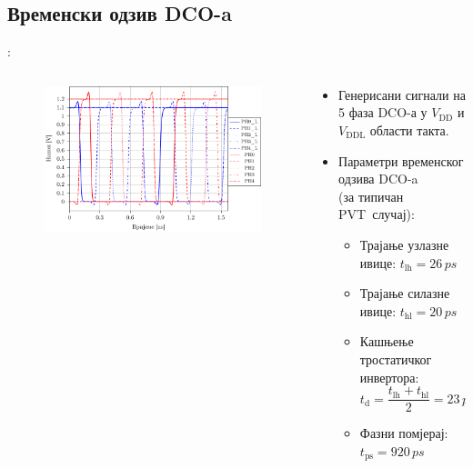 \documentclass[aspectratio=169]{beamer}
\def \DCO  {DCO} %
\def \PVT  {PVT} %
\begin{document}
\subsection{Временски одзив \DCO-a}

\begin{frame}{\secname: \subsecname}
    \begin{columns}[t]
        \begin{column}{0.54\textwidth}
            \begin{figure}[!t]
            	\centering
            	\includegraphics[scale=0.64]{slike/prezentacija/sim_DCO_phases.pdf}
            	\label{DCO_phases}
            \end{figure}
		\end{column}
		\begin{column}{0.46\textwidth}
	    \small
            \begin{itemize}
                \item Генерисани сигнали на 5 фаза \DCO-а у $V_\text{DD}$ и $V_\text{DDL}$ области такта.
                \item Параметри временског одзива \DCO-a \\ (за типичан \PVT\ случај):
                    \begin{itemize}
                        \item Трајање узлазне ивице: $t_\text{lh}=26\,ps$ 
                        \item Трајање силазне ивице: $t_\text{hl}=20\,ps$
                        \item Кашњење тростатичког инвертора:
                			\begin{equation}
                    			t_\text{d} = \dfrac{t_\text{lh} + t_\text{hl}}{2} = 23\,ps \nonumber
                			\end{equation}
                        \item Фазни помјерај: $t_\text{ps}=920\,ps$
                    \end{itemize}
            \end{itemize}
		\end{column}
	\end{columns}
\end{frame}
\end{document}
